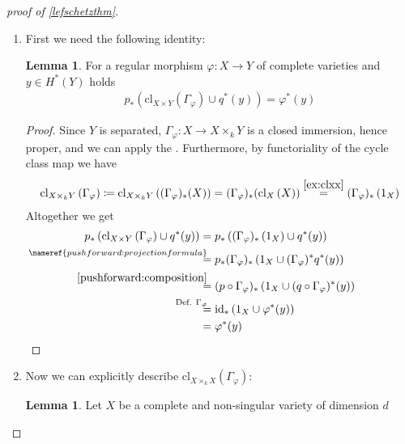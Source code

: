 \documentclass[english]{scrartcl}
\theoremstyle{definition}
\newtheorem{Lem}[Def]{Lemma}
\theoremstyle{remark}
\newcommand*{\id}{\text{id}} %
\newcommand*{\Graph}[1]{\Gamma_{#1}} %
\newcommand*{\cl}[2]{\text{cl}_{#1}\left(#2\right)} %
\newcommand*{\one}[1]{1_{#1}}%
\renewcommand*{\phi}{\varphi}
\begin{document}
\begin{proof}[proof of \autoref{lefschetzthm}]~
  \begin{enumerate}[label={Step \arabic*.}]
  \item %
    First we need the following identity:
    \begin{Lem}\label{step1}
      For a regular morphism $\phi\colon X\to Y$ of complete varieties
      and $y\in H^*(Y)$ holds
      \begin{gather*}
        p_*\left(\cl{X\times Y}{\Graph{\phi}} \cup q^*(y)\right)
        = \phi^*(y)           
      \end{gather*}
      \begin{proof}
        Since $Y$ is separated, $\Graph{\phi}\colon X\to X\times_k Y$
        is a closed immersion, hence proper, and we can apply the 
        . %
        Furthermore, by functoriality of the cycle class map we have
        \begin{gather}
          \cl{X\times_k Y}{\Graph{\phi}} \coloneqq
          \cl{X\times_k Y}{(\Graph{\phi})_*(X)} =
          (\Graph{\phi})_*(\cl{X}{X}) \overset{\ref{ex:clxx}}{=} %
          (\Graph{\phi})_*\left(\one{X}\right)
        \end{gather}
        Altogether we get
        \begin{align*}
          p_*\left(\cl{X\times Y}{\Graph{\phi}} \cup q^*(y)\right)
          &=  p_*\left(
            (\Graph{\phi})_*\left(\one{X}\right) \cup q^*(y)
            \right)\\
          &\overset{\mathllap{\nameref{pushforward:projectionformula}}}{=}
            p_*(\Graph{\phi})_*\left( \one{X} \cup (\Graph{\phi})^*q^*(y) \right)\\
          &\overset{\mathllap{\eqref{pushforward:composition}}}=
            (p\circ\Graph{\phi})_* \left(
            \one{X} \cup (q\circ\Graph{\phi})^*(y) \right)\\
          &\overset{\mathllap{\text{Def. $\Graph\phi$}}}=
            \id_* \left( \one{X} \cup \phi^*(y) \right)\\
          &= \phi^*(y)
        \end{align*}
      \end{proof}
    \end{Lem}
  \item Now we can explicitly describe
    $\cl{X\times_k X}{\Graph{\phi}}$:
    \begin{Lem}
      Let $X$ be a complete and non-singular variety of dimension $d$

\end{Lem}
\end{enumerate}
\end{proof}
\end{document}
